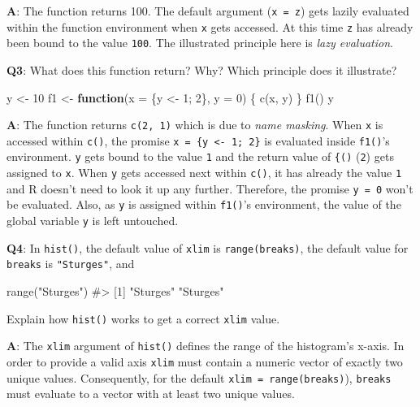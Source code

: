 \documentclass[
]{krantz}
\makeatletter
\newenvironment{Shaded}{\begin{snugshade}}{\end{snugshade}}
\newcommand{\CommentTok}[1]{\textcolor[rgb]{0.56,0.35,0.01}{\textit{#1}}}
\newcommand{\ControlFlowTok}[1]{\textcolor[rgb]{0.13,0.29,0.53}{\textbf{#1}}}
\newcommand{\DataTypeTok}[1]{\textcolor[rgb]{0.13,0.29,0.53}{#1}}
\newcommand{\DecValTok}[1]{\textcolor[rgb]{0.00,0.00,0.81}{#1}}
\newcommand{\KeywordTok}[1]{\textcolor[rgb]{0.13,0.29,0.53}{\textbf{#1}}}
\newcommand{\NormalTok}[1]{#1}
\newcommand{\StringTok}[1]{\textcolor[rgb]{0.31,0.60,0.02}{#1}}
\newenvironment{kframe}{%
\medskip{}
\setlength{\fboxsep}{.8em}
 \def\at@end@of@kframe{}%
 \ifinner\ifhmode%
  \def\at@end@of@kframe{\end{minipage}}%
  \begin{minipage}{\columnwidth}%
 \fi\fi%
 \def\FrameCommand##1{\hskip\@totalleftmargin \hskip-\fboxsep
 \colorbox{shadecolor}{##1}\hskip-\fboxsep
     \hskip-\linewidth \hskip-\@totalleftmargin \hskip\columnwidth}%
 \MakeFramed {\advance\hsize-\width
   \@totalleftmargin\z@ \linewidth\hsize
   \@setminipage}}%
 {\par\unskip\endMakeFramed%
 \at@end@of@kframe}
\renewenvironment{Shaded}{\begin{kframe}}{\end{kframe}}
\renewcommand{\KeywordTok} [1]{\textcolor[rgb]{0.00,0.44,0.13}{{#1}}}
\renewcommand{\DataTypeTok}[1]{\textcolor[rgb]{0.56,0.13,0.00}{{#1}}}
\renewcommand{\DecValTok}  [1]{\textcolor[rgb]{0.25,0.63,0.44}{{#1}}}
\renewcommand{\StringTok}  [1]{\textcolor[rgb]{0.25,0.44,0.63}{{#1}}}
\renewcommand{\CommentTok} [1]{\textcolor[rgb]{0.38,0.63,0.69}{{#1}}}
\renewcommand{\NormalTok}  [1]{{#1}}
\makeatother
\begin{document}
\textbf{{A}}: The function returns 100. The default argument (\texttt{x\ =\ z}) gets lazily evaluated within the function environment when \texttt{x} gets accessed. At this time \texttt{z} has already been bound to the value \texttt{100}. The illustrated principle here is \emph{lazy evaluation}.

\textbf{{Q3}}: What does this function return? Why? Which principle does it illustrate?

\begin{Shaded}
\begin{Highlighting}[]
\NormalTok{y <-}\StringTok{ }\DecValTok{10}
\NormalTok{f1 <-}\StringTok{ }\ControlFlowTok{function}\NormalTok{(}\DataTypeTok{x =}\NormalTok{ \{y <-}\StringTok{ }\DecValTok{1}\NormalTok{; }\DecValTok{2}\NormalTok{\}, }\DataTypeTok{y =} \DecValTok{0}\NormalTok{) \{}
  \KeywordTok{c}\NormalTok{(x, y)}
\NormalTok{\}}
\KeywordTok{f1}\NormalTok{()}
\NormalTok{y}
\end{Highlighting}
\end{Shaded}

\textbf{{A}}: The function returns \texttt{c(2,\ 1)} which is due to \emph{name masking}. When \texttt{x} is accessed within \texttt{c()}, the promise \texttt{x\ =\ \{y\ \textless{}-\ 1;\ 2\}} is evaluated inside \texttt{f1()}'s environment. \texttt{y} gets bound to the value \texttt{1} and the return value of \texttt{\{()} (\texttt{2}) gets assigned to \texttt{x}. When \texttt{y} gets accessed next within \texttt{c()}, it has already the value \texttt{1} and R doesn't need to look it up any further. Therefore, the promise \texttt{y\ =\ 0} won't be evaluated. Also, as \texttt{y} is assigned within \texttt{f1()}'s environment, the value of the global variable \texttt{y} is left untouched.

\textbf{{Q4}}: In \texttt{hist()}, the default value of \texttt{xlim} is \texttt{range(breaks)}, the default value for \texttt{breaks} is \texttt{"Sturges"}, and

\begin{Shaded}
\begin{Highlighting}[]
\KeywordTok{range}\NormalTok{(}\StringTok{"Sturges"}\NormalTok{)}
\CommentTok{#> [1] "Sturges" "Sturges"}
\end{Highlighting}
\end{Shaded}

Explain how \texttt{hist()} works to get a correct \texttt{xlim} value.

\textbf{{A}}: The \texttt{xlim} argument of \texttt{hist()} defines the range of the histogram's x-axis. In order to provide a valid axis \texttt{xlim} must contain a numeric vector of exactly two unique values. Consequently, for the default \texttt{xlim\ =\ range(breaks)}), \texttt{breaks} must evaluate to a vector with at least two unique values.
\end{document}
